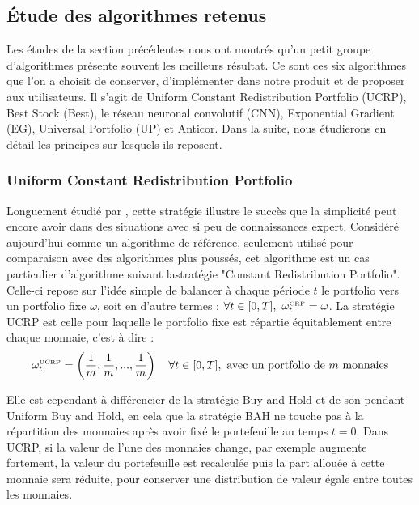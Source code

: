 \documentclass[a4paper, 10pt]{article}
\begin{document}
\subsection{Étude des algorithmes retenus}
\label{sec:theorie_etude}

Les études de la section précédentes nous ont montrés qu'un petit groupe d'algorithmes présente souvent les meilleurs résultat. Ce sont ces six algorithmes que l'on a choisit de conserver, d'implémenter dans notre produit et de proposer aux utilisateurs. Il s'agit de Uniform Constant Redistribution Portfolio (UCRP), Best Stock (Best), le réseau neuronal convolutif (CNN), Exponential Gradient (EG), Universal Portfolio (UP) et Anticor. Dans la suite, nous étudierons en détail les principes sur lesquels ils reposent.

\subsubsection{Uniform Constant Redistribution Portfolio}
\label{sec:theorie_ucrp}

Longuement étudié par \citet{Cover1991}, cette stratégie illustre le succès que la simplicité peut encore avoir dans des situations avec si peu de connaissances expert. Considéré aujourd'hui comme un algorithme de référence, seulement utilisé pour comparaison avec des algorithmes plus poussés, cet algorithme est un cas particulier d’algorithme suivant lastratégie "Constant Redistribution Portfolio". Celle-ci repose sur l'idée simple de balancer à chaque période $t$ le portfolio vers un portfolio fixe $\omega$, soit en d'autre termes : $\forall t \in [0, T],\ \omega_t^{\text{\tiny CRP}} = \omega$. La stratégie UCRP est celle pour laquelle le portfolio fixe est répartie équitablement entre chaque monnaie, c'est à dire :
\begin{equation}
    \omega_t^{\text{\tiny UCRP}} = \left(\frac{1}{m}, \frac{1}{m}, ..., \frac{1}{m} \right) \quad \forall t \in [0, T], \text{ avec un portfolio de $m$ monnaies} 
\end{equation}

Elle est cependant à différencier de la stratégie Buy and Hold et de son pendant Uniform Buy and Hold, en cela que la stratégie BAH ne touche pas à la répartition des monnaies après avoir fixé le portefeuille au temps $t=0$. Dans UCRP, si la valeur de l'une des monnaies change, par exemple augmente fortement, la valeur du portefeuille est recalculée puis la part allouée à cette monnaie sera réduite, pour conserver une distribution de valeur égale entre toutes les monnaies.
\end{document}

